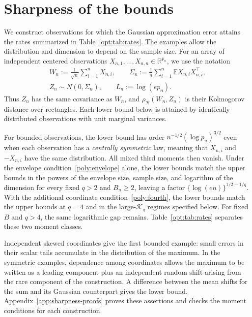 \documentclass[11pt,letterpaper]{article}
\theoremstyle{remark}
\newcommand{\E}{\mathbb E}
\newcommand{\R}{\mathbb R}
\newcommand{\rh}{\rho_{\mathcal R}}
\begin{document}
\section{Sharpness of the bounds}\label{opt:section}

We construct observations for which the Gaussian approximation error
attains the rates summarized in Table~\ref{opt:tab:rates}. The examples
allow the distribution and dimension to depend on the sample size.
For an array of independent centered observations
\(X_{n,1},\ldots,X_{n,n}\in\R^{p_n}\), we use the notation
\begin{equation}
\begin{gathered}
 W_n:=\frac1{\sqrt n}\sum_{i=1}^nX_{n,i},\qquad
 \Sigma_n:=\frac1n\sum_{i=1}^n\E X_{n,i}X_{n,i}^{\top},\\
 Z_n\sim N(0,\Sigma_n),\qquad L_n:=\log(ep_n).
\end{gathered}
\label{lower:eq:setup}
\end{equation}
Thus \(Z_n\) has the same covariance as \(W_n\), and
\(\rh(W_n,Z_n)\) is their Kolmogorov distance over rectangles.
Each lower bound below is attained by identically distributed
observations with unit marginal variances.

For bounded observations, the lower bound has order
\(n^{-1/2}(\log p_n)^{3/2}\) even when each observation has a
\emph{centrally symmetric} law, meaning that
\(X_{n,i}\) and \(-X_{n,i}\) have the same distribution.
All mixed third moments then vanish.
{Under the envelope condition~\eqref{poly:envelope}
alone, the lower bounds match {the upper bounds in} the powers of the envelope size, sample
size, and logarithm of the dimension for every fixed \(q>2\) and
\(B_n\ge2\), leaving a factor \(\{\log(en)\}^{1/2-1/q}\).
With the additional coordinate condition~\eqref{poly:fourth}, the
lower bounds match the upper bounds at \(q=4\) and in the
large-\(\mathcal K_q\) regimes specified below. For fixed \(B\)
and \(q>4\), the same logarithmic gap remains.
Table~\ref{opt:tab:rates} separates these two moment classes.}

Independent skewed coordinates give the first bounded example:
small errors in their scalar tails accumulate in the distribution of
the maximum. In the symmetric examples, dependence among coordinates
allows the maximum to be written as a leading component plus an
independent random shift {arising from the rare component of the construction}. A difference between the mean shifts for
the sum and its Gaussian counterpart gives the lower bound.
Appendix~\ref{app:sharpness-proofs} proves these assertions and checks
the moment conditions for each construction.
\end{document}
